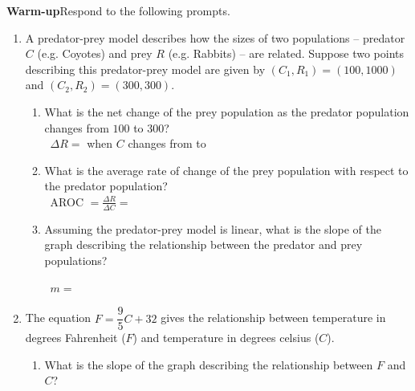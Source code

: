 \documentclass[10pt]{article}
\begin{document}
{\bf\color{blue}Warm-up}\exercise {}Respond to the following prompts.\\[-0.25in]
    \begin{enumerate}
    \item[(a)] A predator-prey model describes how the sizes of two populations -- predator $C$ (e.g. Coyotes) and prey $R$ (e.g. Rabbits) -- are related. Suppose two points describing this predator-prey model  are given by $(C_1,R_1)=(100,1000)$ and $(C_2,R_2)=(300,300)$.
        \begin{enumerate}

        \item[i.] What is the net change of the prey population as the predator population changes from $100$ to $300$?\\
             \,\hfill
            {\Large $\Delta R=$ when $C$ changes from to  } 
            \hfill\,\\      
                    \item[ii.] What is the average rate of change of the prey population with respect to the predator population?\\
            
            \,\hfill
            {\Large AROC $=\frac{\Delta R}{\Delta C}=$  }
            \hfill\,\\

        \item[iii.] Assuming the predator-prey model is linear, what is the slope of the graph describing the relationship between the predator and prey populations?

            \,\hfill
            {\Large $m=$ }
            \hfill\,\\    
            
        \end{enumerate}
        
    \item[(b)] The equation $F=\dfrac95C+32$ gives the relationship between temperature in degrees Fahrenheit ($F$) and temperature in degrees celsius ($C$). 
        \begin{enumerate}
        \item[i.] What is the slope of the graph describing the relationship between $F$ and $C$?\\
            

\end{enumerate}
\end{enumerate}
\end{document}

